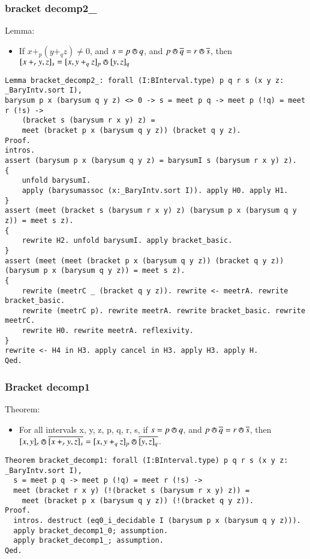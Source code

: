 \documentclass[a4paper,10pt]{article} %
\newcommand{\meet}{\circledwedge}
\begin{document}
\subsubsection{bracket decomp2\_}
Lemma:
\begin{itemize}
    \item If $x + _p(y + _qz) \neq 0$, and $s = p \meet q$, and $p \meet \overline{q} = r \meet \overline{s}$, then $[x + _ry, z]_s = [x, y + _qz]_p \meet [y, z]_q$
\end{itemize}
\begin{lstlisting}
Lemma bracket_decomp2_: forall (I:BInterval.type) p q r s (x y z: _BaryIntv.sort I),
barysum p x (barysum q y z) <> 0 -> s = meet p q -> meet p (!q) = meet r (!s) ->  
    (bracket s (barysum r x y) z) = 
    meet (bracket p x (barysum q y z)) (bracket q y z).
Proof.
intros.
assert (barysum p x (barysum q y z) = barysumI s (barysum r x y) z).
{
    unfold barysumI.
    apply (barysumassoc (x:_BaryIntv.sort I)). apply H0. apply H1.
} 
assert (meet (bracket s (barysum r x y) z) (barysum p x (barysum q y z)) = meet s z).
{
    rewrite H2. unfold barysumI. apply bracket_basic.
}
assert (meet (meet (bracket p x (barysum q y z)) (bracket q y z)) (barysum p x (barysum q y z)) = meet s z).
{
    rewrite (meetrC _ (bracket q y z)). rewrite <- meetrA. rewrite bracket_basic.
    rewrite (meetrC p). rewrite meetrA. rewrite bracket_basic. rewrite meetrC. 
    rewrite H0. rewrite meetrA. reflexivity.
}
rewrite <- H4 in H3. apply cancel in H3. apply H3. apply H.
Qed.
\end{lstlisting}

\subsubsection{Bracket decomp1}
Theorem:
\begin{itemize}
    \item For all intervals x, y, z, p, q, r, s, if $s = p \meet q$, and $p \meet \overline{q} = r \meet \overline{s}$, then $[x, y]_r \meet\overline{[x + _ry, z]_s} = [x, y + _qz]_p \meet \overline{[y, z]_q}$.
\end{itemize}
\begin{lstlisting}
Theorem bracket_decomp1: forall (I:BInterval.type) p q r s (x y z: _BaryIntv.sort I),
  s = meet p q -> meet p (!q) = meet r (!s) ->  
  meet (bracket r x y) (!(bracket s (barysum r x y) z)) = 
    meet (bracket p x (barysum q y z)) (!(bracket q y z)).
Proof.
  intros. destruct (eq0_i_decidable I (barysum p x (barysum q y z))).
  apply bracket_decomp1_0; assumption.
  apply bracket_decomp1_; assumption.
Qed.
\end{lstlisting}
\end{document}
